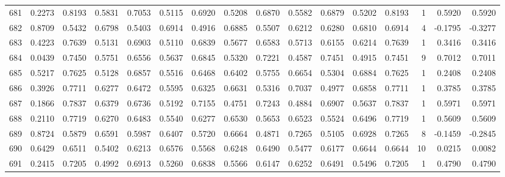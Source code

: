 \begin{tabular}{lrrrrrrrrrrrrrrr}
681 &      0.2273 &  0.8193 &  0.5831 &  0.7053 &  0.5115 &  0.6920 &  0.5208 &  0.6870 &  0.5582 &  0.6879 &   0.5202 &     0.8193 &      1 &                    0.5920 &                     0.5920 \\
682 &      0.8709 &  0.5432 &  0.6798 &  0.5403 &  0.6914 &  0.4916 &  0.6885 &  0.5507 &  0.6212 &  0.6280 &   0.6810 &     0.6914 &      4 &                   -0.1795 &                    -0.3277 \\
683 &      0.4223 &  0.7639 &  0.5131 &  0.6903 &  0.5110 &  0.6839 &  0.5677 &  0.6583 &  0.5713 &  0.6155 &   0.6214 &     0.7639 &      1 &                    0.3416 &                     0.3416 \\
684 &      0.0439 &  0.7450 &  0.5751 &  0.6556 &  0.5637 &  0.6845 &  0.5320 &  0.7221 &  0.4587 &  0.7451 &   0.4915 &     0.7451 &      9 &                    0.7012 &                     0.7011 \\
685 &      0.5217 &  0.7625 &  0.5128 &  0.6857 &  0.5516 &  0.6468 &  0.6402 &  0.5755 &  0.6654 &  0.5304 &   0.6884 &     0.7625 &      1 &                    0.2408 &                     0.2408 \\
686 &      0.3926 &  0.7711 &  0.6277 &  0.6472 &  0.5595 &  0.6325 &  0.6631 &  0.5316 &  0.7037 &  0.4977 &   0.6858 &     0.7711 &      1 &                    0.3785 &                     0.3785 \\
687 &      0.1866 &  0.7837 &  0.6379 &  0.6736 &  0.5192 &  0.7155 &  0.4751 &  0.7243 &  0.4884 &  0.6907 &   0.5637 &     0.7837 &      1 &                    0.5971 &                     0.5971 \\
688 &      0.2110 &  0.7719 &  0.6270 &  0.6483 &  0.5540 &  0.6277 &  0.6530 &  0.5653 &  0.6523 &  0.5524 &   0.6496 &     0.7719 &      1 &                    0.5609 &                     0.5609 \\
689 &      0.8724 &  0.5879 &  0.6591 &  0.5987 &  0.6407 &  0.5720 &  0.6664 &  0.4871 &  0.7265 &  0.5105 &   0.6928 &     0.7265 &      8 &                   -0.1459 &                    -0.2845 \\
690 &      0.6429 &  0.6511 &  0.5402 &  0.6213 &  0.6576 &  0.5568 &  0.6248 &  0.6490 &  0.5477 &  0.6177 &   0.6644 &     0.6644 &     10 &                    0.0215 &                     0.0082 \\
691 &      0.2415 &  0.7205 &  0.4992 &  0.6913 &  0.5260 &  0.6838 &  0.5566 &  0.6147 &  0.6252 &  0.6491 &   0.5496 &     0.7205 &      1 &                    0.4790 &                     0.4790 \\

\end{tabular}
